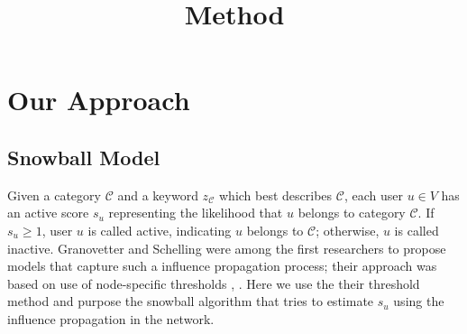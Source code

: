 \documentclass{article}
\begin{document}
\title{Method}

\newcommand{\following}{\ensuremath{following}}
\newcommand{\follower}{\ensuremath{follower}}

\maketitle \else \fi

\newcommand{\argmax}{\operatornamewithlimits{argmax}}

\section{Our Approach}\label{sec:method}

\subsection{Snowball Model}

Given a category $\mathcal{C}$ and a keyword $z_{\mathcal{C}}$ which best describes $\mathcal{C}$, each user $u \in V$ has an active score $s_u$ representing the likelihood that $u$ belongs to category $\mathcal{C}$. If $s_u \geq 1$, user $u$ is called active, indicating $u$ belongs to $\mathcal{C}$; otherwise, $u$ is called inactive. Granovetter and Schelling were among the first researchers to propose models that capture such a influence propagation process; their approach was based on use of node-specific thresholds \cite{snowball1}, \cite{snowball2}. Here we use the their threshold method and purpose the snowball algorithm that tries to estimate $s_u$ using the influence propagation in the network.


\end{document}
